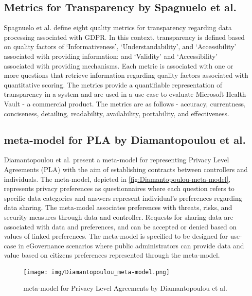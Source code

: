 \subsection*{Metrics for Transparency by Spagnuelo et al.}
Spagnuelo et al. \cite{livraga_metrics_2016} define eight quality metrics for transparency regarding data processing associated with GDPR.
In this context, transparency is defined based on quality factors of `Informativeness', `Understandability', and `Accessibility' associated with providing information; and `Validity' and `Accessibility' associated with providing mechanisms.
Each metric is associated with one or more questions that retrieve information regarding quality factors associated with quantitative scoring.
The metrics provide a quantifiable representation of transparency in a system and are used in a use-case to evaluate Microsoft Health-Vault - a commercial product.
The metrics are as follows - accuracy, currentness, conciseness, detailing, readability, availability, portability, and effectiveness.

\subsection*{meta-model for PLA by Diamantopoulou et al.}
Diamantopoulou et al. present a meta-model for representing Privacy Level Agreements (PLA) with the aim of establishing contracts between controllers and individuals.
The meta-model, depicted in \autoref{fig:Diamantopoulou-meta-model}, represents privacy preferences as questionnaires where each question refers to specific data categories and answers represent individual's preferences regarding data sharing. The meta-model associates preferences with threats, risks, and security measures through data and controller. Requests for sharing data are associated with data and preferences, and can be accepted or denied based on values of linked preferences.
The meta-model is specified to be designed for use-case in eGovernance scenarios where public administrators can provide data and value based on citizens preferences represented through the meta-model.
\begin{figure}[htbp]
    \centering
    \texttt{[image: img/Diamantopoulou\_meta-model.png]}
    \caption{meta-model for Privacy Level Agreements by Diamantopoulou et al. \cite{diamantopoulou_meta-model_2017}}
    \label{fig:Diamantopoulou-meta-model}
\end{figure}

